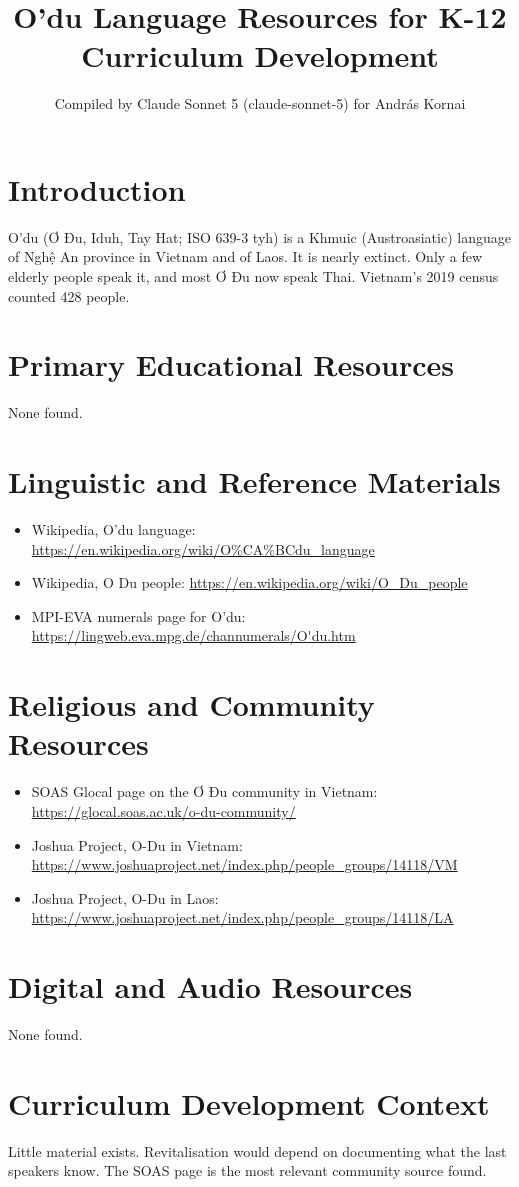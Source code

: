 \documentclass[12pt]{article}
\title{O'du Language Resources for K-12 Curriculum Development}
\author{Compiled by Claude Sonnet 5 (claude-sonnet-5) for Andr\'as Kornai}
\date{}
\begin{document}
\maketitle

\section{Introduction}
O'du (Ơ Đu, Iduh, Tay Hat; ISO 639-3 tyh) is a Khmuic (Austroasiatic) language of Nghệ An province in Vietnam and of Laos. It is nearly extinct. Only a few elderly people speak it, and most Ơ Đu now speak Thai. Vietnam's 2019 census counted 428 people.

\section{Primary Educational Resources}
None found.

\section{Linguistic and Reference Materials}
\begin{itemize}
\item Wikipedia, O'du language: \url{https://en.wikipedia.org/wiki/O%CA%BCdu_language}
\item Wikipedia, O Du people: \url{https://en.wikipedia.org/wiki/O_Du_people}
\item MPI-EVA numerals page for O'du: \url{https://lingweb.eva.mpg.de/channumerals/O'du.htm}
\end{itemize}

\section{Religious and Community Resources}
\begin{itemize}
\item SOAS Glocal page on the Ơ Đu community in Vietnam: \url{https://glocal.soas.ac.uk/o-du-community/}
\item Joshua Project, O-Du in Vietnam: \url{https://www.joshuaproject.net/index.php/people_groups/14118/VM}
\item Joshua Project, O-Du in Laos: \url{https://www.joshuaproject.net/index.php/people_groups/14118/LA}
\end{itemize}

\section{Digital and Audio Resources}
None found.

\section{Curriculum Development Context}
Little material exists. Revitalisation would depend on documenting what the last speakers know. The SOAS page is the most relevant community source found.
\end{document}
